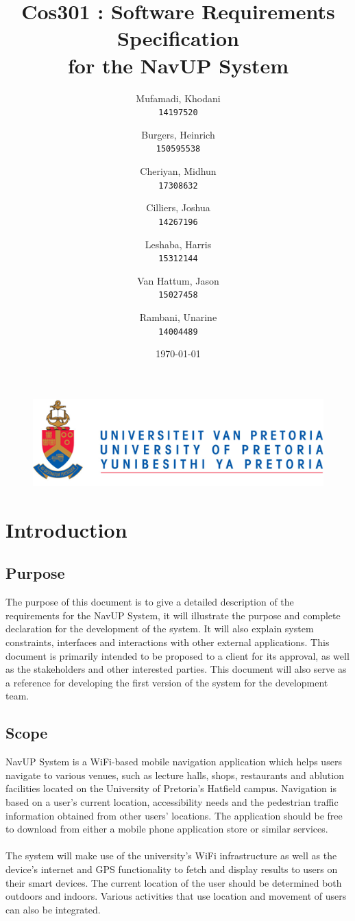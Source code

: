 \documentclass[english]{article}
\author{
	Mufamadi, Khodani\\
	\texttt{14197520}
	\and
	Burgers, Heinrich\\
	\texttt{150595538}
	\and
	Cheriyan, Midhun\\
	\texttt{17308632}
	\and
	Cilliers, Joshua\\
	\texttt{14267196}
	\and
	Leshaba, Harris\\
	\texttt{15312144}
	\and
	Van Hattum, Jason\\
	\texttt{15027458}
	\and
	Rambani, Unarine\\
	\texttt{14004489}
}
\title{Cos301 : Software Requirements Specification\\
	for the NavUP System\\
	}
\date{\today}
\begin{document}
	\maketitle
	\begin{figure}[!t]
		\includegraphics{up_logo.png}
	\end{figure}
	\newpage

	\tableofcontents
	\newpage

	

	\section{Introduction}
			

		\subsection{Purpose}
			The purpose of this document is to give a detailed description of the requirements for the NavUP System, it  will illustrate the purpose and complete declaration for the development of the system. It will also explain system constraints, interfaces and interactions with other external applications. This document is primarily intended to be proposed to a client for its approval, as well as the stakeholders and other interested parties. This document  will also serve as a reference for developing the first version of the system for the development team.

		\subsection{Scope}
			NavUP System is a WiFi-based mobile navigation application which helps users navigate to various venues, such as lecture halls, shops, restaurants and ablution facilities located on the University of Pretoria's Hatfield campus. Navigation is based on a user’s current location, accessibility needs and the pedestrian traffic information obtained from other users' locations. The application should be free to download from either a mobile phone application store or similar services.\\
			\\
			The system will make use of the university's WiFi infrastructure as well as the device's internet and GPS functionality to fetch and display results to users on their smart devices. The current location of the user should be determined both outdoors and indoors. Various activities that use location and movement of users can also be integrated.
\end{document}

